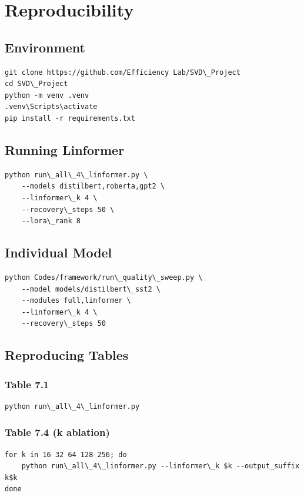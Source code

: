 \section{Reproducibility}

\subsection{Environment}

\begin{lstlisting}
git clone https://github.com/Efficiency Lab/SVD\_Project
cd SVD\_Project
python -m venv .venv
.venv\Scripts\activate
pip install -r requirements.txt
\end{lstlisting}

\subsection{Running Linformer}

\begin{lstlisting}
python run\_all\_4\_linformer.py \
    --models distilbert,roberta,gpt2 \
    --linformer\_k 4 \
    --recovery\_steps 50 \
    --lora\_rank 8
\end{lstlisting}

\subsection{Individual Model}

\begin{lstlisting}
python Codes/framework/run\_quality\_sweep.py \
    --model models/distilbert\_sst2 \
    --modules full,linformer \
    --linformer\_k 4 \
    --recovery\_steps 50
\end{lstlisting}

\subsection{Reproducing Tables}

\subsubsection{Table 7.1}
\begin{lstlisting}
python run\_all\_4\_linformer.py
\end{lstlisting}

\subsubsection{Table 7.4 (k ablation)}
\begin{lstlisting}
for k in 16 32 64 128 256; do
    python run\_all\_4\_linformer.py --linformer\_k $k --output_suffix k$k
done
\end{lstlisting}

